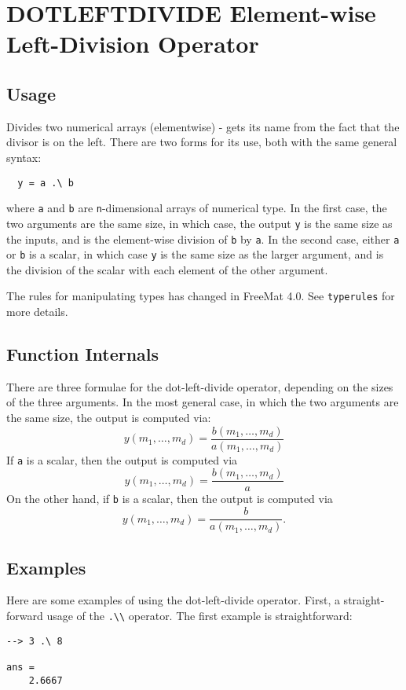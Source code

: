 \section{DOTLEFTDIVIDE Element-wise Left-Division Operator}

\subsection{Usage}

Divides two numerical arrays (elementwise) - gets its name from the 
fact that the divisor is on the left.  There are two forms
for its use, both with the same general syntax:
\begin{verbatim}
  y = a .\ b
\end{verbatim}
where \verb|a| and \verb|b| are \verb|n|-dimensional arrays of numerical type.  In the
first case, the two arguments are the same size, in which case, the 
output \verb|y| is the same size as the inputs, and is the element-wise
division of \verb|b| by \verb|a|.  In the second case, either \verb|a| or \verb|b| is a scalar, 
in which case \verb|y| is the same size as the larger argument,
and is the division of the scalar with each element of the other argument.

The rules for manipulating types has changed in FreeMat 4.0.  See \verb|typerules|
for more details.

\subsection{Function Internals}

There are three formulae for the dot-left-divide operator, depending on the
sizes of the three arguments.  In the most general case, in which 
the two arguments are the same size, the output is computed via:
\[
y(m_1,\ldots,m_d) = \frac{b(m_1,\ldots,m_d)}{a(m_1,\ldots,m_d)}
\]
If \verb|a| is a scalar, then the output is computed via
\[
y(m_1,\ldots,m_d) = \frac{b(m_1,\ldots,m_d)}{a}
\]
On the other hand, if \verb|b| is a scalar, then the output is computed via
\[
y(m_1,\ldots,m_d) = \frac{b}{a(m_1,\ldots,m_d)}.
\]
\subsection{Examples}

Here are some examples of using the dot-left-divide operator.  First, a 
straight-forward usage of the \verb|.\\| operator.  The first example
is straightforward:
\begin{verbatim}
--> 3 .\ 8

ans = 
    2.6667 
\end{verbatim}

